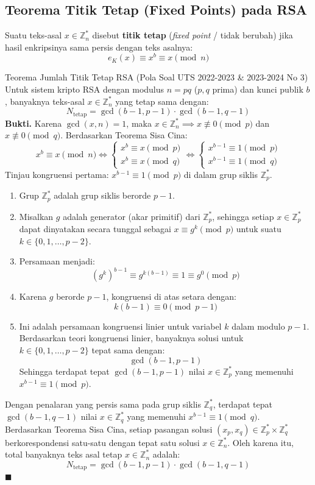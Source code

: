 \documentclass[11pt,a4paper]{article}
\newenvironment{proof}{\noindent\textbf{Bukti.}}{\hfill$\blacksquare$\vspace{0.3em}}
\begin{document}
\subsection{Teorema Titik Tetap (Fixed Points) pada RSA}
Suatu teks-asal $x \in \mathbb{Z}_n^*$ disebut \textbf{titik tetap} (\textit{fixed point} / tidak berubah) jika hasil enkripsinya sama persis dengan teks asalnya:
\[
e_K(x) \equiv x^b \equiv x \pmod n
\]
\begin{thmbox}{Teorema Jumlah Titik Tetap RSA (Pola Soal UTS 2022-2023 \& 2023-2024 No 3)}
Untuk sistem kripto RSA dengan modulus $n = pq$ ($p, q$ prima) dan kunci publik $b$, banyaknya teks-asal $x \in \mathbb{Z}_n^*$ yang tetap sama dengan:
\[
N_{\text{tetap}} = \gcd(b - 1, p - 1) \cdot \gcd(b - 1, q - 1)
\]
\begin{proof}
Karena $\gcd(x, n) = 1$, maka $x \in \mathbb{Z}_n^* \implies x \not\equiv 0 \pmod p$ dan $x \not\equiv 0 \pmod q$. Berdasarkan Teorema Sisa Cina:
\[
x^b \equiv x \pmod n \iff
\begin{cases}
x^b \equiv x \pmod p \\
x^b \equiv x \pmod q
\end{cases}
\iff
\begin{cases}
x^{b-1} \equiv 1 \pmod p \\
x^{b-1} \equiv 1 \pmod q
\end{cases}
\]
Tinjau kongruensi pertama: $x^{b-1} \equiv 1 \pmod p$ di dalam grup siklis $\mathbb{Z}_p^*$.
\begin{enumerate}
    \item Grup $\mathbb{Z}_p^*$ adalah grup siklis berorde $p - 1$.
    \item Misalkan $g$ adalah generator (akar primitif) dari $\mathbb{Z}_p^*$, sehingga setiap $x \in \mathbb{Z}_p^*$ dapat dinyatakan secara tunggal sebagai $x \equiv g^k \pmod p$ untuk suatu $k \in \{0, 1, \dots, p - 2\}$.
    \item Persamaan menjadi:
    \[
    (g^k)^{b-1} \equiv g^{k(b-1)} \equiv 1 \equiv g^0 \pmod p
    \]
    \item Karena $g$ berorde $p - 1$, kongruensi di atas setara dengan:
    \[
    k(b - 1) \equiv 0 \pmod{p - 1}
    \]
    \item Ini adalah persamaan kongruensi linier untuk variabel $k$ dalam modulo $p - 1$. Berdasarkan teori kongruensi linier, banyaknya solusi untuk $k \in \{0, 1, \dots, p - 2\}$ tepat sama dengan:
    \[
    \gcd(b - 1, p - 1)
    \]
    Sehingga terdapat tepat $\gcd(b - 1, p - 1)$ nilai $x \in \mathbb{Z}_p^*$ yang memenuhi $x^{b-1} \equiv 1 \pmod p$.
\end{enumerate}
Dengan penalaran yang persis sama pada grup siklis $\mathbb{Z}_q^*$, terdapat tepat $\gcd(b - 1, q - 1)$ nilai $x \in \mathbb{Z}_q^*$ yang memenuhi $x^{b-1} \equiv 1 \pmod q$.\\
Berdasarkan Teorema Sisa Cina, setiap pasangan solusi $(x_p, x_q) \in \mathbb{Z}_p^* \times \mathbb{Z}_q^*$ berkorespondensi satu-satu dengan tepat satu solusi $x \in \mathbb{Z}_n^*$. Oleh karena itu, total banyaknya teks asal tetap $x \in \mathbb{Z}_n^*$ adalah:
\[
N_{\text{tetap}} = \gcd(b - 1, p - 1) \cdot \gcd(b - 1, q - 1)
\]
\end{proof}
\end{thmbox}
\end{document}
